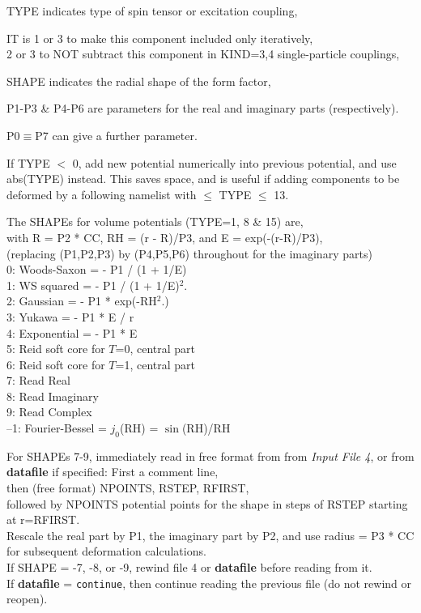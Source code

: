 \documentclass[11pt]{article}
\begin{document}
%

\noindent
TYPE indicates type of spin tensor or excitation coupling,

\noindent
IT is 1 or 3 to make this component included only iteratively,\\
 \hspace*{8mm} 2 or 3 to NOT subtract this component in KIND=3,4 single-particle  couplings,

\noindent
SHAPE indicates the radial shape of the form factor,

\noindent
P1-P3 \& P4-P6  are parameters for the real and imaginary parts (respectively).

\noindent
P0$\equiv$P7 can give a further parameter.

\medskip

If TYPE $<$ 0, add new potential numerically into previous potential,
and use abs(TYPE) instead.   This saves space, and is useful if adding
 components to be deformed by a following namelist with $\leq$ TYPE $\leq$ 13.


\bigskip

The SHAPEs for volume potentials (TYPE=1, 8 \& 15) are,
\\
with R = P2 * CC, RH = (r - R)/P3, and E = exp(-(r-R)/P3),
\\
(replacing (P1,P2,P3) by (P4,P5,P6) throughout for the imaginary parts)\\
%
   0: Woods-Saxon  = - P1 / (1 + 1/E)
\\ 1: WS squared   = - P1 / (1 + 1/E)$^2$.
\\ 2: Gaussian     = - P1 * exp(-RH$^2$.)
\\ 3: Yukawa       = - P1 * E / r
\\ 4: Exponential  = - P1 * E
\\ 5: Reid soft core for $T$=0, central part
\\ 6: Reid soft core for $T$=1, central part
\\ 7: Read Real
\\ 8: Read Imaginary
\\ 9: Read Complex
\\--1: Fourier-Bessel = $j_0$(RH) = $\sin$(RH)/RH


For SHAPEs 7-9, immediately read in free format from from {\em Input File 4}, or from {\bf datafile} if specified:
First a comment line,\\
then (free format) NPOINTS, RSTEP, RFIRST, \\
followed by NPOINTS potential points for the shape in steps of RSTEP starting at r=RFIRST.
\\
Rescale the real part by P1, the imaginary part by P2,
and use radius = P3 * CC for subsequent deformation calculations.
\\
If SHAPE = -7, -8, or -9, rewind file 4 or {\bf datafile} before reading from it.\\
If {\bf datafile} = {\tt continue}, then continue reading the previous file (do not rewind or reopen).\\
\bigskip
\end{document}

